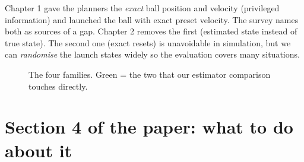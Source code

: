 \documentclass[11pt,a4paper]{article}
\begin{document}
\begin{ours}
Chapter 1 gave the planners the \emph{exact} ball position and velocity (privileged information)
and launched the ball with exact preset velocity. The survey names both as sources of a gap.
Chapter 2 removes the first (estimated state instead of true state). The second one (exact
resets) is unavoidable in simulation, but we can \emph{randomise} the launch states widely so the
evaluation covers many situations.
\end{ours}

\begin{figure}[H]
\centering
{}
\caption{The four families. Green = the two that our estimator comparison touches directly.}
\end{figure}

\section{Section 4 of the paper: what to do about it}
\end{document}
